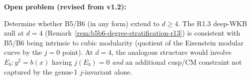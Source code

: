 \textbf{Open problem (revised from v1.2):}
\begin{problem}\label{op:b5-degree-d}
Determine whether B5/B6 (in any form) extend to $d\geq 4$.
The R1.3 deep-WKB null at $d=4$ (Remark~\ref{rem:b5b6-degree-stratification-r13})
is consistent with B5/B6 being intrinsic to cubic modularity
(quotient of the Eisenstein modular curve by the $j=0$ point).
At $d=4$, the analogous structure would involve $E_b: y^2=b(x)$
having $j(E_b)=0$ \textit{and} an additional cusp/CM constraint
not captured by the genus-1 $j$-invariant alone.
\end{problem}
